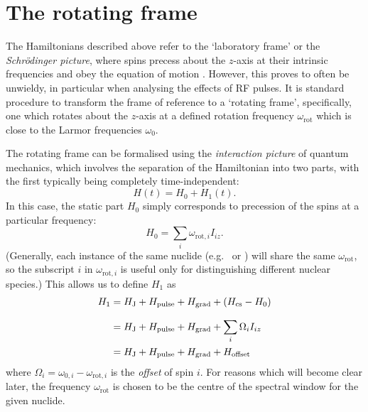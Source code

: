 \section{The rotating frame}
\label{sec:theory__rotating_frame}

The Hamiltonians described above refer to the `laboratory frame' or the \textit{Schr\"odinger picture}, where spins precess about the $z$-axis at their intrinsic frequencies and obey the equation of motion .
However, this proves to often be unwieldy, in particular when analysing the effects of RF pulses.
It is standard procedure to transform the frame of reference to a `rotating frame', specifically, one which rotates about the $z$-axis at a defined rotation frequency $\omega_\text{rot}$ which is close to the Larmor frequencies $\omega_0$.

The rotating frame can be formalised using the \textit{interaction picture} of quantum mechanics,\autocite{Sakurai2021} which involves the separation of the Hamiltonian into two parts, with the first typically being completely time-independent:
\begin{equation}
    \label{eq:interaction_ham}
    H(t) = H_0 + H_1(t).
\end{equation}
In this case, the static part $H_0$ simply corresponds to precession of the spins at a particular frequency:
\begin{equation}
    \label{eq:interaction_ham0}
    H_0 = \sum_i \omega_{\text{rot},i}I_{iz}.
\end{equation}
(Generally, each instance of the same nuclide (e.g.\ \proton{} or \carbon{}) will share the same $\omega_\text{rot}$, so the subscript $i$ in $\omega_{\text{rot},i}$ is useful only for distinguishing different nuclear species.)
This allows us to define $H_1$ as
\begin{align}
    \label{eq:reduced_ham}
    H_1 &= H_\text{J} + H_\text{pulse} + H_\text{grad} + \left(H_\text{cs} - H_0\right) \\[7pt] \notag
        &= H_\text{J} + H_\text{pulse} + H_\text{grad} + \sum_i \Omega_i I_{iz} \\ \notag
        &= H_\text{J} + H_\text{pulse} + H_\text{grad} + H_\text{offset}
\end{align}
where $\Omega_i = \omega_{0,i} - \omega_{\text{rot},i}$ is the \textit{offset} of spin $i$.
For reasons which will become clear later, the frequency $\omega_\text{rot}$ is chosen to be the centre of the spectral window for the given nuclide.

